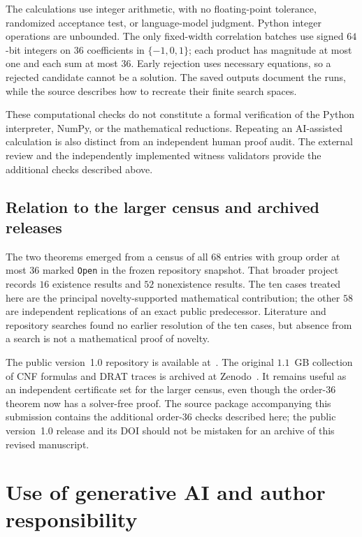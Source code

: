 \documentclass[11pt]{article}
\theoremstyle{remark}
\begin{document}
The calculations use integer arithmetic, with no floating-point tolerance,
randomized acceptance test, or language-model judgment.  Python integer
operations are unbounded.  The only fixed-width correlation batches use
signed $64$-bit integers on $36$ coefficients in $\{-1,0,1\}$; each product
has magnitude at most one and each sum at most $36$.  Early rejection uses
necessary equations, so a rejected candidate cannot be a solution.  The
saved outputs document the runs, while the source describes how to recreate
their finite search spaces.

These computational checks do not constitute a formal verification of the
Python interpreter, NumPy, or the mathematical reductions.  Repeating an
AI-assisted calculation is also distinct from an independent human proof
audit.  The external review and the independently implemented witness
validators provide the additional checks described above.

\subsection{Relation to the larger census and archived releases}

The two theorems emerged from a census of all $68$ entries with group order at
most $36$ marked \texttt{Open} in the frozen repository snapshot.  That
broader project records $16$ existence results and $52$ nonexistence results.
The ten cases treated here are the principal novelty-supported mathematical
contribution; the other $58$ are independent replications of an exact public
predecessor.  Literature and repository searches found no earlier resolution
of the ten cases, but absence from a search is not a mathematical proof of
novelty.

The public version~1.0 repository is available at~\cite{masselot-repo}.
The original $1.1$~GB collection of CNF formulas and DRAT traces is archived
at Zenodo~\cite{zenodo}.  It remains useful as an independent certificate set
for the larger census, even though the order-$36$ theorem now has a
solver-free proof.  The source package accompanying this submission contains
the additional order-$36$ checks described here; the public version~1.0
release and its DOI should not be mistaken for an archive of this revised
manuscript.

\section{Use of generative AI and author responsibility}
\end{document}
